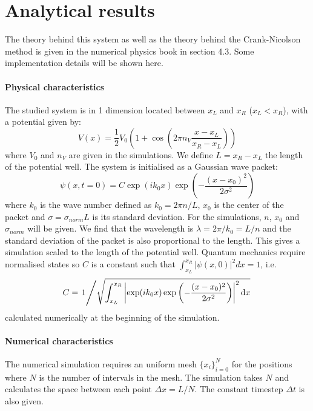 \section{Analytical results}

The theory behind this system as well as the theory behind the Crank-Nicolson method is given in the numerical physics book \cite{physnumbook} in section 4.3. Some implementation details will be shown here.

\paragraph{Physical characteristics} The studied system is in 1 dimension located between \(x_L\) and \(x_R\) (\(x_L < x_R\)), with a potential given by:
\begin{equation}
    V(x) = \frac{1}{2} V_0 \left( 1 + \cos \left( 2\pi n_V \frac{x - x_L}{x_R - x_L} \right) \right)
\end{equation}
where \(V_0\) and \(n_V\) are given in the simulations. We define \(L = x_R - x_L\) the length of the potential well. The system is initialised as a Gaussian wave packet:
\begin{equation}
    \psi(x, t=0) = C \exp(i k_0 x)\exp\left(-\frac{(x-x_0)^2}{2\sigma^2}\right)
\end{equation}
where $k_0$ is the wave number defined as $k_0 = 2\pi n/L$, $x_0$ is the center of the packet and \mbox{$\sigma = \sigma_{norm}L$} is its standard deviation. For the simulations, $n$, $x_0$ and $\sigma_{norm}$ will be given. We find that the wavelength is $\lambda = 2\pi/k_0 = L/n$ and the standard deviation of the packet is also proportional to the length. This gives a simulation scaled to the length of the potential well. Quantum mechanics require normalised states so \(C\) is a constant such that \mbox{\(\int_{x_L}^{x_R}|\psi(x,0)|^2 dx = 1\)}, i.e.
\begin{equation}
    C = \left. 1\middle/\sqrt{\int_{x_L}^{x_R} \left|\exp(i k_0 x)\exp\left(-\frac{(x-x_0)^2}{2\sigma^2}\right)\right|^2 \mathrm{d}x} \right.
\end{equation}
calculated numerically at the beginning of the simulation.

\paragraph{Numerical characteristics} The numerical simulation requires an uniform mesh $\{x_i\}_{i=0}^N$ for the positions where $N$ is the number of intervals in the mesh. The simulation takes $N$ and calculates the space between each point $\Delta x = L/N$. The constant timestep $\Delta t$ is also given.

